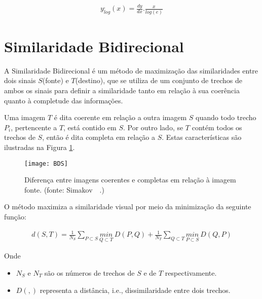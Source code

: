 \begin{align} \label{eqConceitoLog1}
          y^,_{log}(x) = \frac{dy}{dx}.\frac{x}{log(e)}
\end{align}

\section{Similaridade Bidirecional} \label{conceitoSimilaridadeBidirecional}
	A Similaridade Bidirecional \cite{simakov} é um método de maximização das similaridades entre dois sinais $S$(fonte) e $T$(destino), que se utiliza de um conjunto de trechos de ambos os sinais para definir a similaridade tanto em relação à sua coerência quanto à completude das informações.
	
	Uma imagem $T$ é dita coerente em relação a outra imagem $S$ quando todo trecho $P_i$, pertencente a $T$, está contido em $S$. Por outro lado, se $T$ contém todos os trechos de $S$, então é dita completa em relação a $S$. Estas características são ilustradas na Figura \ref{figConceitoBDS}.
	
\begin{figure}[H]
  \centering
  \texttt{[image: BDS]}
  \caption{Diferença entre imagens coerentes e completas em relação à imagem fonte. (fonte: Simakov~\etal~\protect\cite{simakov}.)}  
  \label{figConceitoBDS}
\end{figure}

	O método maximiza a similaridade visual por meio da minimização da seguinte função:
	
\begin{align} \label{eqConceitoSimilaridade}
          d(S,T) = \frac{1}{N_S}\sum\limits_{P \subset S}{\underset{Q \subset T}{min}~D(P,Q)} + \frac{1}{N_T}\sum\limits_{Q \subset T}{\underset{P \subset S}{min}~D(Q,P)}
\end{align}

Onde
\begin{itemize}
	\item $N_S$ e $N_T$ são os números de trechos de $S$ e de $T$ respectivamente.
	\item $D(,)$ representa a distância, i.e., dissimilaridade entre dois trechos. 
\end{itemize} 
	
